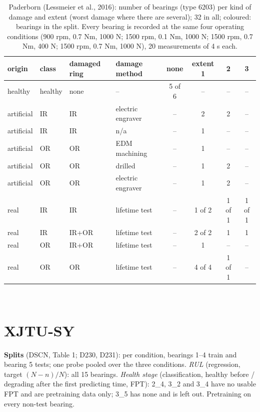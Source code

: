 \begin{table}[ht]
\centering
\footnotesize
\begin{tabular}{llllcccc}
\toprule
origin & class & damaged ring & damage method & none & extent 1 & 2 & 3 \\
\midrule
healthy & healthy & none & -- & \colorbox{bothc}{5} of 6 & -- & -- & -- \\
\midrule
artificial & IR & IR & electric engraver & -- & 2 & 2 & -- \\
artificial & IR & IR & n/a & -- & 1 & -- & -- \\
artificial & OR & OR & EDM machining & -- & 1 & -- & -- \\
artificial & OR & OR & drilled & -- & 1 & 2 & -- \\
artificial & OR & OR & electric engraver & -- & 1 & 2 & -- \\
\midrule
real & IR & IR & lifetime test & -- & \colorbox{bothc}{1} of 2 & \colorbox{bothc}{1} of 1 & \colorbox{bothc}{1} of 1 \\
real & IR & IR+OR & lifetime test & -- & \colorbox{bothc}{2} of 2 & 1 & 1 \\
real & OR & IR+OR & lifetime test & -- & 1 & -- & -- \\
real & OR & OR & lifetime test & -- & \colorbox{bothc}{4} of 4 & \colorbox{bothc}{1} of 1 & -- \\
\bottomrule
\end{tabular}
\\[4pt] \splitlegend
\caption{Paderborn (Lessmeier et al., 2016): number of bearings (type 6203) per kind of damage and extent (worst damage where there are several); 32 in all; coloured: bearings in the split. Every bearing is recorded at the same four operating conditions (900 rpm, 0.7 Nm, 1000 N; 1500 rpm, 0.1 Nm, 1000 N; 1500 rpm, 0.7 Nm, 400 N; 1500 rpm, 0.7 Nm, 1000 N), 20 measurements of 4 s each.}
\end{table}

\section{XJTU-SY}
\textbf{Splits} (DSCN, Table 1; D230, D231): per condition, bearings 1--4 train and bearing 5 tests; one probe pooled over the three conditions. \emph{RUL} (regression, target $(N-n)/N$): all 15 bearings. \emph{Health stage} (classification, healthy before / degrading after the first predicting time, FPT): 2\_4, 3\_2 and 3\_4 have no usable FPT and are pretraining data only; 3\_5 has none and is left out. Pretraining on every non-test bearing.

